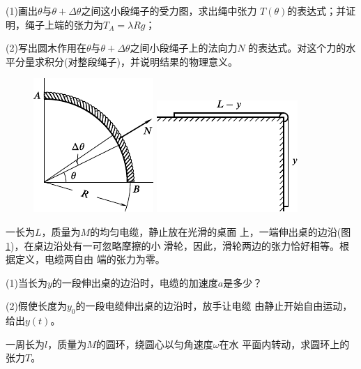 \begin{exercises}
(1)画出$ \theta $与$ \theta + \Delta \theta$之间这小段绳子的受力图，求出绳中张力
$ T (\theta) $的表达式；并证明，绳子上端的张力为$ T _ { A } = \lambda R g $；

(2)写出圆木作用在$ \theta $与$ \theta + \Delta \theta $之间小段绳子上的法向力$ N $
的表达式。对这个力的水平分量求积分(对整段绳子)，并说明结果的物理意义。
\begin{figure}[h]
  \begin{minipage}[b]{0.5\linewidth}
    \centering
    \includegraphics{figure/fig03.37}
    \caption{}
    \label{fig:03.37}
  \end{minipage}
  \begin{minipage}[b]{0.5\linewidth}
    \centering
    \includegraphics{figure/fig03.38}
    \caption{}
    \label{fig:03.38}
  \end{minipage}
  \vspace{-1.56em}
\end{figure}

\exercise 一长为$ L $，质量为$ M $的均匀电缆，静止放在光滑的桌面
上，一端伸出桌的边沿(图\ref{fig:03.38})，在桌边沿处有一可忽略摩擦的小
滑轮，因此，滑轮两边的张力恰好相等。根据定义，电缆两自由
端的张力为零。

(1)当长为$ y $的一段伸出桌的边沿时，电缆的加速度$ a $是多少？

(2)假使长度为$ y _ { 0 } $的一段电缆伸出桌的边沿时，放手让电缆
由静止开始自由运动，给出$ y(t) $。

\exercise 一周长为$ l $，质量为$ M $的圆环，绕圆心以匀角速度$ \omega $在水
平面内转动，求圆环上的张力$ T $。


\end{exercises}
